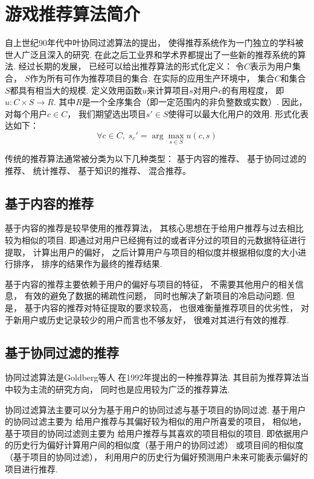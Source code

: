 \section{游戏推荐算法简介}

自上世纪90年代中叶协同过滤算法的提出\cite{adomaviciusNextGenerationRecommender2005}，
使得推荐系统作为一门独立的学科被世人广泛且深入的研究.
在此之后工业界和学术界都提出了一些新的推荐系统的算法.
经过长期的发展，
已经可以给出推荐算法的形式化定义：
令$C$表示为用户集合，
$S$作为所有可作为推荐项目的集合.
在实际的应用生产环境中，
集合$C$和集合$S$都具有相当大的规模.
定义效用函数$u$来计算项目$s$对用户$c$的有用程度，
即$u:C\times S\rightarrow R$.
其中$R$是一个全序集合（即一定范围内的非负整数或实数）.
因此，
对每个用户$c\in C$，
我们期望选出项目$s'\in S$使得可以最大化用户的效用.
形式化表达如下：
\begin{equation}
    \forall c\in C,\; s_c'=\arg \max_{s\in S} u(c,s)
\end{equation}

传统的推荐算法通常被分类为以下几种类型\cite{canoHybridRecommenderSystems2017}：
基于内容的推荐、
基于协同过滤的推荐、
统计推荐、
基于知识的推荐、
混合推荐。

\subsection{基于内容的推荐}

基于内容的推荐是较早使用的推荐算法，
其核心思想在于给用户推荐与过去相比较为相似的项目.
即通过对用户已经拥有过的或者评分过的项目的元数据特征进行提取，
计算出用户的偏好，
之后计算用户与项目的相似度并根据相似度的大小进行排序，
排序的结果作为最终的推荐结果.

基于内容的推荐主要依赖于用户的偏好与项目的特征，
不需要其他用户的相关信息，
有效的避免了数据的稀疏性问题，
同时也解决了新项目的冷启动问题.
但是，
基于内容的推荐对特征提取的要求较高，
也很难衡量推荐项目的优劣性，
对于新用户或历史记录较少的用户而言也不够友好，
很难对其进行有效的推荐.

\subsection{基于协同过滤的推荐}

协同过滤算法是Goldberg等人\cite{goldbergUsingCollaborativeFiltering1992}
在1992年提出的一种推荐算法.
其目前为推荐算法当中较为主流的研究方向，
同时也是应用较为广泛的推荐算法.

协同过滤算法主要可以分为基于用户的协同过滤与基于项目的协同过滤.
基于用户的协同过滤主要为
给用户推荐与其偏好较为相似的用户所喜爱的项目，
相似地，
基于项目的协同过滤则主要为
给用户推荐与其喜欢的项目相似的项目.
即依据用户的历史行为偏好计算用户间的相似度（基于用户的协同过滤）
或项目间的相似度（基于项目的协同过滤），
利用用户的历史行为偏好预测用户未来可能表示偏好的项目进行推荐.

